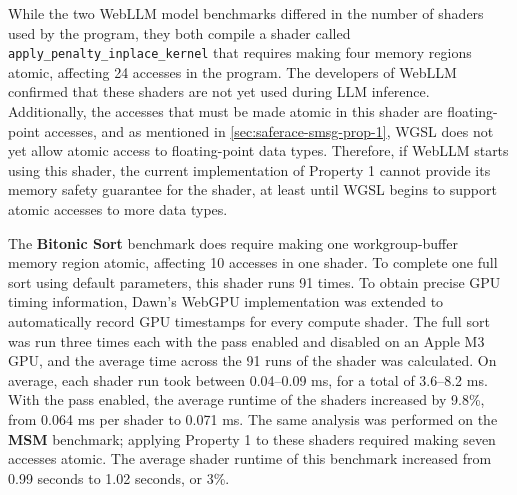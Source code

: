 While the two WebLLM model benchmarks differed in the number of shaders used by the program, they both compile a shader called \texttt{apply\_penalty\_inplace\_kernel} that requires making four memory regions atomic, affecting 24 accesses in the program. The developers of WebLLM confirmed that these shaders are not yet used during LLM inference. Additionally, the accesses that must be made atomic in this shader are floating-point accesses, and as mentioned in \mysec\ref{sec:saferace-smsg-prop-1}, WGSL does not yet allow atomic access to floating-point data types. Therefore, if WebLLM starts using this shader, the current implementation of Property 1 cannot provide its memory safety guarantee for the shader, at least until WGSL begins to support atomic accesses to more data types.

The \textbf{Bitonic Sort} benchmark does require making one workgroup-buffer memory region atomic, affecting 10 accesses in one shader. To complete one full sort using default parameters, this shader runs 91 times. To obtain precise GPU timing information, Dawn's WebGPU implementation was extended to automatically record GPU timestamps for every compute shader. The full sort was run three times each with the pass enabled and disabled on an Apple M3 GPU, and the average time across the 91 runs of the shader was calculated. On average, each shader run took between 0.04--0.09 ms, for a total of 3.6--8.2 ms. With the pass enabled, the average runtime of the shaders increased by 9.8\%, from 0.064 ms per shader to 0.071 ms. The same analysis was performed on the \textbf{MSM} benchmark; applying \smsg Property 1 to these shaders required making seven accesses atomic. The average shader runtime of this benchmark increased from 0.99 seconds to 1.02 seconds, or 3\%.

